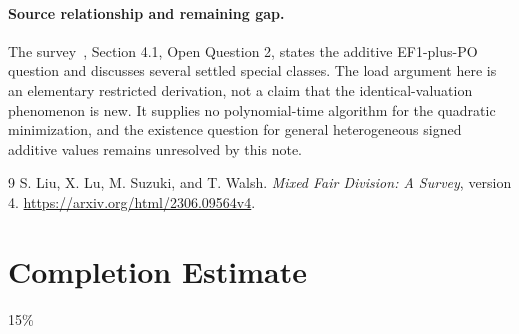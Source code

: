 \documentclass[11pt]{article}
\theoremstyle{definition}
\theoremstyle{remark}
\begin{document}
\paragraph{Source relationship and remaining gap.}
The survey~\cite{survey}, Section 4.1, Open Question 2, states the additive EF1-plus-PO question and discusses several settled special classes. The load argument here is an elementary restricted derivation, not a claim that the identical-valuation phenomenon is new. It supplies no polynomial-time algorithm for the quadratic minimization, and the existence question for general heterogeneous signed additive values remains unresolved by this note.

\begin{thebibliography}{9}
 S. Liu, X. Lu, M. Suzuki, and T. Walsh.
\emph{Mixed Fair Division: A Survey}, version 4.
\url{https://arxiv.org/html/2306.09564v4}.
\end{thebibliography}

\section{Completion Estimate}
15\%
\end{document}
